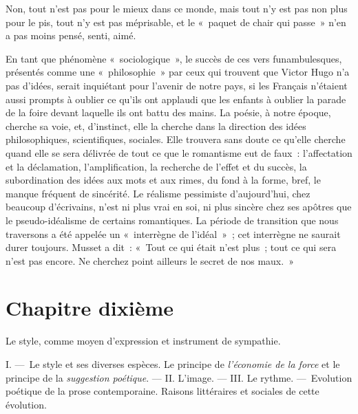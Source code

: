 \documentclass[french,twoside]{book} %
\newcommand\chapteropen{} %
\newcommand\chaptercont{} %
\newcommand\chapterclose{} %
\begin{document}
\noindent Non, tout n’est pas pour le mieux dans ce monde, mais tout n’y est pas non plus pour le pis, tout n’y est pas méprisable, et le « paquet de chair qui passe » n’en a pas moins pensé, senti, aimé.\par
En tant que phénomène « sociologique », le succès de ces vers funambulesques, présentés comme une « philosophie » par ceux qui trouvent que Victor Hugo n’a pas d’idées, serait inquiétant pour l’avenir de notre pays, si les Français n’étaient aussi prompts à oublier ce qu’ils ont applaudi que les enfants à oublier la parade de la foire devant laquelle ils ont battu des mains. La poésie, à notre époque, cherche sa voie, et, d’instinct, elle la cherche dans la direction des idées philosophiques, scientifiques, sociales. Elle trouvera sans doute ce qu’elle cherche quand elle se sera délivrée de tout ce que le romantisme eut de faux : l’affectation et la déclamation, l’amplification, la recherche de l’effet et du succès, la subordination des idées aux mots et aux rimes, du fond à la forme, bref, le manque fréquent de sincérité. Le réalisme pessimiste d’aujourd’hui, chez beaucoup d’écrivains, n’est ni plus vrai en soi, ni plus sincère chez ses apôtres que le pseudo-idéalisme de certains romantiques. La période de transition que nous traversons a été appelée un « interrègne de l’idéal » ; cet interrègne ne saurait durer toujours. Musset a dit : « Tout ce qui était n’est plus ; tout ce qui sera n’est pas encore. Ne cherchez point ailleurs le secret de nos maux. »
\chapterclose


\chapteropen
\chapter[{Chapitre dixième}]{Chapitre dixième}\renewcommand{\leftmark}{Chapitre dixième}

\begin{center}Le style, comme moyen d’expression et instrument de sympathie.\end{center}

\chaptercont
\noindent I. — Le style et ses diverses espèces. Le principe de \emph{l’économie de la force} et le principe de la \emph{suggestion poétique}. — II. L’image. — III. Le rythme. — Evolution poétique de la prose contemporaine. Raisons littéraires et sociales de cette évolution.\par
\end{document}
